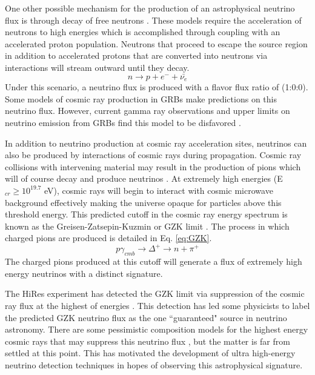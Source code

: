 \documentclass{gatech-thesis}
\begin{document}
One other possible mechanism for the production of an astrophysical neutrino flux is through decay of free neutrons \cite{2015APh....62...66B}. These models require the acceleration of neutrons to high energies which is accomplished through coupling with an accelerated proton population. Neutrons that proceed to escape the source region in addition to accelerated protons that are converted into neutrons via interactions will stream outward until they decay.
\begin{equation}\label{eq:neutron_nu}
n \rightarrow p + e^- + \bar{\nu_e} 
\end{equation}
Under this scenario, a neutrino flux is produced with a flavor flux ratio of (1:0:0). Some models of cosmic ray production in GRBs make predictions on this neutrino flux. However, current gamma ray observations and upper limits on neutrino emission from GRBs find this model to be disfavored \cite{2015APh....62...66B}.

In addition to neutrino production at cosmic ray acceleration sites, neutrinos can also be produced by interactions of cosmic rays during propagation. Cosmic ray collisions with intervening material may result in the production of pions which will of course decay and produce neutrinos \cite{2014arXiv1407.5223L}.  At extremely high energies (E$_{cr} \geq 10^{19.7}$ eV), cosmic rays will begin to interact with cosmic microwave background effectively making the universe opaque for particles above this threshold energy. This predicted cutoff in the cosmic ray energy spectrum is known as the Greisen-Zatsepin-Kuzmin or GZK limit \cite{2006astro.ph..7109H}. The process in which charged pions are produced is detailed in Eq. \ref{eq:GZK}.
\begin{equation}\label{eq:GZK}
p\gamma_{cmb} \rightarrow \Delta^+ \rightarrow n + \pi^+
\end{equation}
The charged pions produced at this cutoff will generate a flux of extremely high energy neutrinos with a distinct signature.

The HiRes experiment has detected the GZK limit via suppression of the cosmic ray flux at the highest of energies \cite{2008PhRvL.100j1101A}. This detection has led some physicists to label the predicted GZK neutrino flux as the one ``guaranteed" source in neutrino astronomy. There are some pessimistic composition models for the highest energy cosmic rays that may suppress this neutrino flux \cite{2011APh....34..620A}, but the matter is far from settled at this point. This has motivated the development of ultra high-energy neutrino detection techniques in hopes of observing this astrophysical signature.
\end{document}
